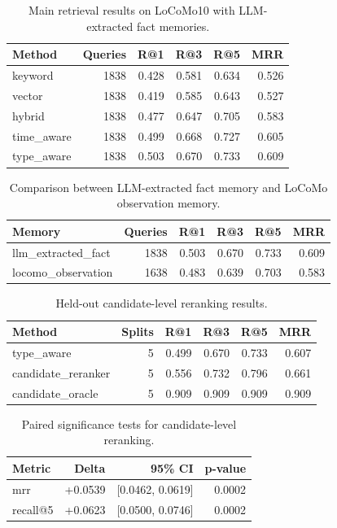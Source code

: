 \begin{table}[t]
\centering
\caption{Main retrieval results on LoCoMo10 with LLM-extracted fact memories.}
\label{tab:main_retrieval}
\begin{tabular}{lrrrrr}
\toprule
Method & Queries & R@1 & R@3 & R@5 & MRR \\
\midrule
keyword & 1838 & 0.428 & 0.581 & 0.634 & 0.526 \\
vector & 1838 & 0.419 & 0.585 & 0.643 & 0.527 \\
hybrid & 1838 & 0.477 & 0.647 & 0.705 & 0.583 \\
time\_aware & 1838 & 0.499 & 0.668 & 0.727 & 0.605 \\
type\_aware & 1838 & 0.503 & 0.670 & 0.733 & 0.609 \\
\bottomrule
\end{tabular}
\end{table}

\begin{table}[t]
\centering
\caption{Comparison between LLM-extracted fact memory and LoCoMo observation memory.}
\label{tab:memory_forms}
\begin{tabular}{lrrrrr}
\toprule
Memory & Queries & R@1 & R@3 & R@5 & MRR \\
\midrule
llm\_extracted\_fact & 1838 & 0.503 & 0.670 & 0.733 & 0.609 \\
locomo\_observation & 1638 & 0.483 & 0.639 & 0.703 & 0.583 \\
\bottomrule
\end{tabular}
\end{table}

\begin{table}[t]
\centering
\caption{Held-out candidate-level reranking results.}
\label{tab:candidate_reranker}
\begin{tabular}{lrrrrr}
\toprule
Method & Splits & R@1 & R@3 & R@5 & MRR \\
\midrule
type\_aware & 5 & 0.499 & 0.670 & 0.733 & 0.607 \\
candidate\_reranker & 5 & 0.556 & 0.732 & 0.796 & 0.661 \\
candidate\_oracle & 5 & 0.909 & 0.909 & 0.909 & 0.909 \\
\bottomrule
\end{tabular}
\end{table}

\begin{table}[t]
\centering
\caption{Paired significance tests for candidate-level reranking.}
\label{tab:candidate_reranker_sig}
\begin{tabular}{lrrr}
\toprule
Metric & Delta & 95\% CI & p-value \\
\midrule
mrr & +0.0539 & [0.0462, 0.0619] & 0.0002 \\
recall@5 & +0.0623 & [0.0500, 0.0746] & 0.0002 \\
\bottomrule
\end{tabular}
\end{table}

